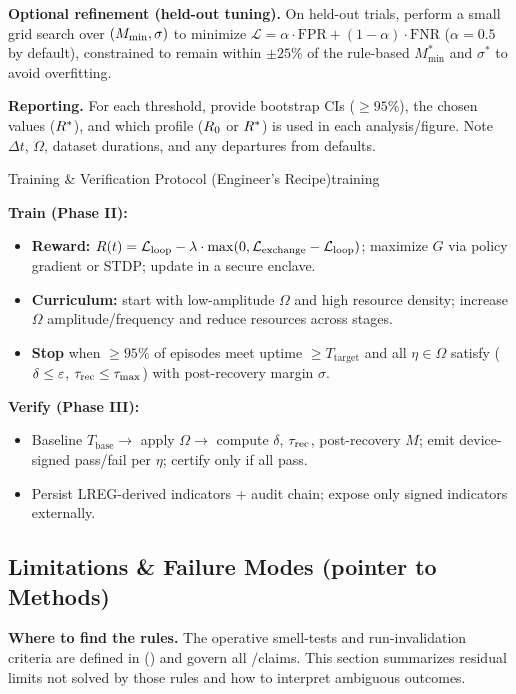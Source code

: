 \documentclass[11pt]{article}
\begin{document}
\textbf{Optional refinement (held-out tuning).} On held-out trials, perform a small grid search over $(M_{\min}, \sigma)$ to minimize $\mathcal{L} = \alpha \cdot \text{FPR} + (1-\alpha) \cdot \text{FNR}$ ($\alpha = 0.5$ by default), constrained to remain within $\pm 25\%$ of the rule-based $M^*_{\min}$ and $\sigma^*$ to avoid overfitting.

\textbf{Reporting.} For each threshold, provide bootstrap CIs ($\geq 95\%$), the chosen values ($R^*$), and which profile ($R_0$ or $R^*$) is used in each analysis/figure. Note $\Delta t$, $\Omega$, dataset durations, and any departures from defaults.

\begin{docbox}{Training \& Verification Protocol (Engineer's Recipe)}{training}

\textbf{Train (Phase II):}
\begin{itemize}
\item \textbf{Reward:} $R(t) = \mathcal{L}_{\text{loop}} - \lambda \cdot \max(0, \mathcal{L}_{\text{exchange}} - \mathcal{L}_{\text{loop}})$; maximize $G$ via policy gradient or STDP; update in a secure enclave.
\item \textbf{Curriculum:} start with low-amplitude $\Omega$ and high resource density; increase $\Omega$ amplitude/frequency and reduce resources across stages.
\item \textbf{Stop} when $\geq 95\%$ of episodes meet \NC uptime $\geq T_{\text{target}}$ and all $\eta \in \Omega$ satisfy \SC ($\delta \leq \varepsilon$, $\tau_{\text{rec}} \leq \tau_{\max}$) with post-recovery margin $\sigma$.
\end{itemize}

\textbf{Verify (Phase III):}
\begin{itemize}
\item Baseline $T_{\text{base}} \rightarrow$ apply $\Omega \rightarrow$ compute $\delta$, $\tau_{\text{rec}}$, post-recovery $M$; emit device-signed pass/fail per $\eta$; certify only if all pass.
\item Persist LREG-derived indicators + audit chain; expose only signed indicators externally.
\end{itemize}
\end{docbox}

\subsection{Limitations \& Failure Modes (pointer to Methods)}

\textbf{Where to find the rules.} The operative smell-tests and run-invalidation criteria are defined in  () and govern all \NC/\SC claims. This section summarizes residual limits not solved by those rules and how to interpret ambiguous outcomes.
\end{document}
